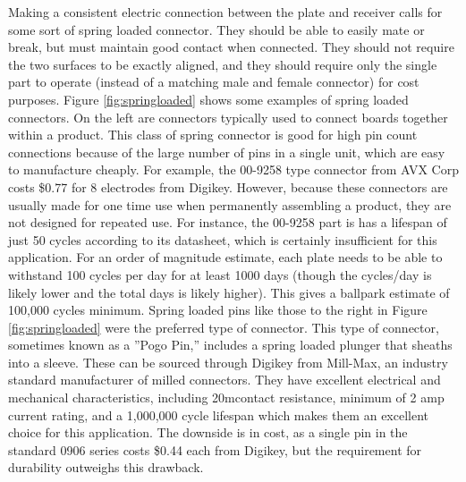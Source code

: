 		Making a consistent electric connection between the plate and receiver calls for some sort of spring loaded connector.  They should be able to easily mate or break, but must maintain good contact when connected.  They should not require the two surfaces to be exactly aligned, and they should require only the single part to operate (instead of a matching male and female connector) for cost purposes.  Figure \ref{fig:springloaded} shows some examples of spring loaded connectors.  On the left are connectors typically used to connect boards together within a product. This class of spring connector is good for high pin count connections because of the large number of pins in a single unit, which are easy to manufacture cheaply. For example, the 00-9258 type connector from AVX Corp costs \$0.77 for 8 electrodes from Digikey. However, because these connectors are usually made for one time use when permanently assembling a product, they are not designed for repeated use. For instance, the 00-9258 part is has a lifespan of just 50 cycles according to its datasheet, which is certainly insufficient for this application. For an order of magnitude estimate, each plate needs to be able to withstand 100 cycles per day for at least 1000 days (though the cycles/day is likely lower and the total days is likely higher). This gives a ballpark estimate of 100,000 cycles minimum.  Spring loaded pins like those to the right in Figure \ref{fig:springloaded} were the preferred type of connector.  This type of connector, sometimes known as a ”Pogo Pin,” includes a spring loaded plunger that sheaths into a sleeve. These can be sourced through Digikey from Mill-Max, an industry standard manufacturer of milled connectors. They have excellent electrical and mechanical characteristics, including 20m\ohm contact resistance, minimum of 2 amp current rating, and a 1,000,000 cycle lifespan which makes them an excellent choice for this application.  The downside is in cost, as a single pin in the standard 0906 series costs \$0.44 each from Digikey, but the requirement for durability outweighs this drawback.

